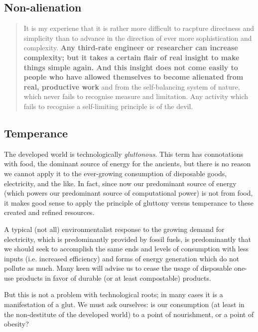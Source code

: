 \documentclass[letterpaper]{article}
\begin{document}
\subsection{Non-alienation}

\begin{quote}
  It is my experiene that it is rather more difficult to racpture directness and simplicity than to advance in the direction of ever more sophistication and complexity. \textbf{Any third-rate engineer or researcher can increase complexity; but it takes a certain flair of real insight to make things simple again. And this insight does not come easily to people who have allowed themselves to become alienated from real, productive work} and from the self-balancing system of nature, which never fails to recognise measure and limitation. Any activity which fails to recognise a self-limiting principle is of the devil.
\end{quote}

\subsection{Temperance}

The developed world is technologically \textit{gluttonous}. This term has connotations with food, the dominant source of energy for the ancients, but there is no reason we cannot apply it to the ever-growing consumption of disposable goods, electricity, and the like. In fact, since now our predominant source of energy (which powers our predominant source of computational power) is not from food, it makes good sense to apply the principle of gluttony versus temperance to these created and refined resources.

A typical (not all) environmentalist response to the growing demand for electricity, which is predominantly provided by fossil fuels, is predominantly that we should seek to accomplish the same ends and levels of consumption with less inputs (i.e. increased efficiency) and forms of energy generation which do not pollute as much. Many keen will advise us to cease the usage of disposable one-use products in favor of durable (or at least compostable) products.

But this is not a problem with technological roots; in many cases it is a manifestation of a glut. We must ask ourselves: is our consumption (at least in the non-destitute of the developed world) to a point of nourishment, or a point of obesity?
\end{document}
